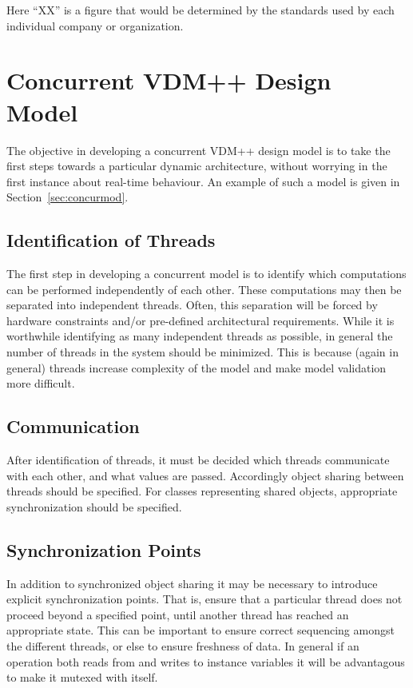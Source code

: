 \documentclass{overturerepchap}
\begin{document}
Here ``XX'' is a figure that would be determined by the standards used
by each individual company or organization.

\section{Concurrent VDM++ Design Model}\label{sec:concur}

The objective in developing a concurrent VDM++ design model is to take
the first steps towards a particular dynamic architecture, without
worrying in the first instance about real-time behaviour. An example
of such a model is given in Section~\ref{sec:concurmod}.

\subsection{Identification of Threads}

The first step in developing a concurrent model is to identify which
computations can be performed independently of each other. These
computations may then be separated into independent threads. Often,
this separation will be forced by hardware constraints and/or
pre-defined architectural requirements. While it is worthwhile
identifying as many independent threads as possible, in general the
number of threads in the system should be minimized. This is because
(again in general) threads increase complexity of the model and make model
validation more difficult.

\subsection{Communication}

After identification of threads, it must be decided which threads
communicate with each other, and what values are passed. Accordingly
object sharing between threads should be specified. For classes
representing shared objects, appropriate synchronization should be
specified.

\subsection{Synchronization Points}

In addition to synchronized object sharing it may be necessary to
introduce explicit synchronization points. That is, ensure that a
particular thread does not proceed beyond a specified point, until
another thread has reached an appropriate state. This can be important
to ensure correct sequencing amongst the different threads, or else to
ensure freshness of data. In general if an operation both reads from
and writes to instance variables it will be advantagous to make it
mutexed with itself.
\end{document}
